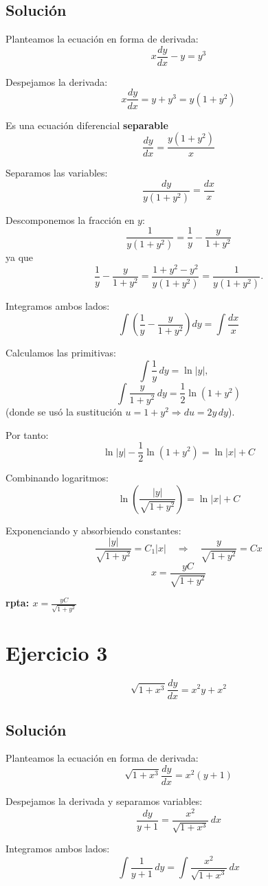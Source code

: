 \documentclass[12pt,a4paper]{article}
\begin{document}
\begin{multicols}{2}
\subsection*{Solución}
Planteamos la ecuación en forma de derivada:
\[x\frac{dy}{dx} - y = y^3\]

Despejamos la derivada:
\[x\frac{dy}{dx} = y + y^3 = y(1 + y^2)\]

Es una ecuación diferencial \textbf{separable}
\[\frac{dy}{dx} = \frac{y(1 + y^2)}{x}\]

Separamos las variables:
\[\frac{dy}{y(1 + y^2)} = \frac{dx}{x}\]

Descomponemos la fracción en \(y\):
\[\frac{1}{y(1 + y^2)} = \frac{1}{y} - \frac{y}{1 + y^2}\]
ya que 
\[\frac{1}{y} - \frac{y}{1 + y^2} = \frac{1 + y^2 - y^2}{y(1 + y^2)} = \frac{1}{y(1 + y^2)}.\]

Integramos ambos lados:
\[
\int\left(\frac{1}{y} - \frac{y}{1 + y^2}\right)dy = \int \frac{dx}{x}
\]

Calculamos las primitivas:
\[
\int \frac{1}{y}\,dy = \ln|y|, \quad 
\]
\[
\int \frac{y}{1 + y^2}\,dy = \frac{1}{2}\ln(1 + y^2)
\]
(donde se usó la sustitución \(u = 1 + y^2 \Rightarrow du = 2y\,dy\)).

Por tanto:
\[
\ln|y| - \frac{1}{2}\ln(1 + y^2) = \ln|x| + C
\]

Combinando logaritmos:
\[
\ln\left(\frac{|y|}{\sqrt{1 + y^2}}\right) = \ln|x| + C
\]

Exponenciando y absorbiendo constantes:
\[
\frac{|y|}{\sqrt{1 + y^2}} = C_1|x| \quad \Rightarrow \quad \frac{y}{\sqrt{1 + y^2}} = Cx
\]
\[
x = \frac{yC}{\sqrt{1 + y^2}}
\]

\textbf{rpta: $x = \frac{yC}{\sqrt{1 + y^2}}$}

\columnbreak
\section*{Ejercicio 3}
\[\sqrt{1+x^3}\frac{dy}{dx}=x^2y+x^2 \]

\subsection*{Solución}

Planteamos la ecuación en forma de derivada:
\[\sqrt{1+x^3}\frac{dy}{dx}=x^2(y+1)\]

Despejamos la derivada y separamos variables:
\[\frac{dy}{y+1}=\frac{x^2}{\sqrt{1+x^3}}\,dx\]

Integramos ambos lados:
\[
\int\frac{1}{y+1}\,dy=\int\frac{x^2}{\sqrt{1+x^3}}\,dx
\]


\end{multicols}
\end{document}
